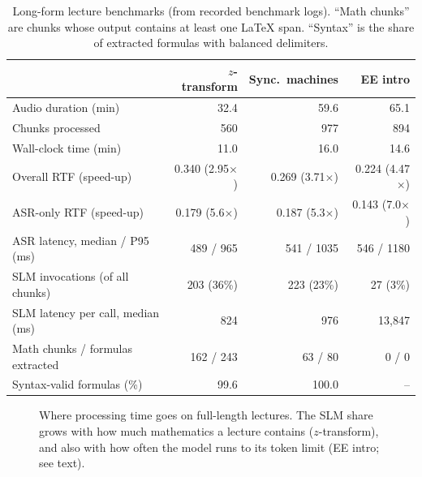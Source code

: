 \documentclass[11pt,a4paper,oneside]{report}
\theoremstyle{definition}
\begin{document}
\begin{table}[ht]
\centering\small
\caption{Long-form lecture benchmarks (from recorded benchmark logs). ``Math chunks'' are chunks whose output contains at least one LaTeX span. ``Syntax'' is the share of extracted formulas with balanced delimiters.}
\label{tab:lectures}
\begin{tabular}{@{}l rrr@{}}
\toprule
& \textbf{$z$-transform} & \textbf{Sync.\ machines} & \textbf{EE intro} \\
\midrule
Audio duration (min) & 32.4 & 59.6 & 65.1 \\
Chunks processed & 560 & 977 & 894 \\
Wall-clock time (min) & 11.0 & 16.0 & 14.6 \\
Overall RTF (speed-up) & 0.340 (2.95$\times$) & 0.269 (3.71$\times$) & 0.224 (4.47$\times$) \\
ASR-only RTF (speed-up) & 0.179 (5.6$\times$) & 0.187 (5.3$\times$) & 0.143 (7.0$\times$) \\
ASR latency, median / P95 (ms) & 489 / 965 & 541 / 1035 & 546 / 1180 \\
SLM invocations (of all chunks) & 203 (36\%) & 223 (23\%) & 27 (3\%) \\
SLM latency per call, median (ms) & 824 & 976 & 13{,}847 \\
Math chunks / formulas extracted & 162 / 243 & 63 / 80 & 0 / 0 \\
Syntax-valid formulas (\%) & 99.6 & 100.0 & -- \\
\bottomrule
\end{tabular}
\end{table}

\begin{figure}[ht]
\centering
{}
\caption{Where processing time goes on full-length lectures. The SLM share grows with how much mathematics a lecture contains ($z$-transform), and also with how often the model runs to its token limit (EE intro; see text).}
\label{fig:rtf}
\end{figure}
\end{document}
